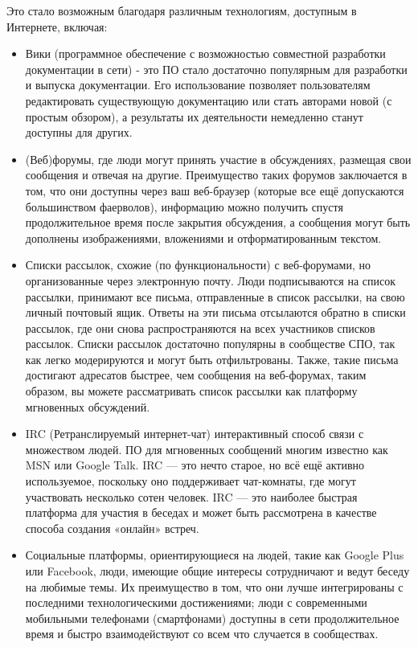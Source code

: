 \documentclass[10pt]{book}
\begin{document}
Это стало возможным благодаря различным технологиям, доступным в Интернете, включая:

\begin{itemize}
	\item Вики (программное обеспечение с возможностью совместной разработки документации в сети) - это ПО стало достаточно популярным для разработки и выпуска документации. Его использование позволяет пользователям редактировать существующую документацию или стать авторами новой (с простым обзором), а результаты их деятельности немедленно станут доступны для других.
	\item (Веб)форумы, где люди могут принять участие в обсуждениях, размещая свои сообщения и отвечая на другие. Преимущество таких форумов заключается в том, что они доступны через ваш веб-браузер (которые все ещё допускаются большинством фаерволов), информацию можно получить спустя продолжительное время после закрытия обсуждения, а сообщения могут быть дополнены изображениями, вложениями и отформатированным текстом.
	\item Списки рассылок, схожие (по функциональности) с веб-форумами, но организованные через электронную почту. Люди подписываются на список рассылки,  принимают все письма, отправленные в список рассылки, на свою личный почтовый ящик. Ответы на эти письма отсылаются обратно в списки рассылок, где они снова распространяются на всех участников списков рассылок. Списки рассылок достаточно популярны в сообществе СПО, так как легко модерируются и могут быть отфильтрованы. Также, такие письма достигают адресатов быстрее, чем сообщения на веб-форумах, таким образом, вы можете рассматривать список рассылки как платформу мгновенных обсуждений.
	\item IRC (Ретранслируемый интернет-чат) интерактивный способ связи с множеством людей. ПО для мгновенных сообщений многим известно как MSN или Google Talk. IRC — это нечто старое, но всё ещё активно используемое, поскольку оно поддерживает чат-комнаты, где могут участвовать несколько сотен человек. IRC — это наиболее быстрая платформа для участия в беседах и может быть рассмотрена в качестве способа создания «онлайн» встреч.
	\item Социальные платформы, ориентирующиеся на людей, такие как Google Plus или Facebook, люди, имеющие общие интересы сотрудничают и ведут беседу на любимые темы. Их преимущество в том, что они лучше интегрированы с последними технологическими достижениями; люди с современными мобильными телефонами (смартфонами) доступны в сети продолжительное время и быстро взаимодействуют со всем что случается в сообществах.
\end{itemize}
\end{document}
